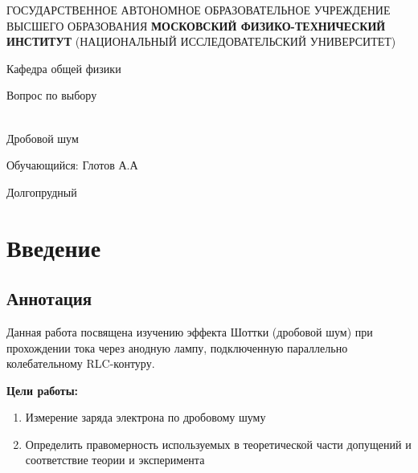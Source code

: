 \documentclass[12pt,a4paper]{article}
\author{Глотов Алексей}
\begin{document}
\newpage
\begin{center}
\footnotesize{{ГОСУДАРСТВЕННОЕ АВТОНОМНОЕ ОБРАЗОВАТЕЛЬНОЕ УЧРЕЖДЕНИЕ}\break
{ВЫСШЕГО ОБРАЗОВАНИЯ}
\break
{\bf {МОСКОВСКИЙ ФИЗИКО-ТЕХНИЧЕСКИЙ ИНСТИТУТ}}
\break
\small{(НАЦИОНАЛЬНЫЙ ИССЛЕДОВАТЕЛЬСКИЙ УНИВЕРСИТЕТ)}}
\break
\hfill \break
\hfill \break
\begin{center}
\large{Кафедра общей физики}
\end{center}
\hfill \break
\hfill \break
\hfill \break
\hfill \break

\begin{center}
\large{Вопрос по выбору}
\end{center}
\hfill \break\\
\LARGE{Дробовой шум}
\end{center}
\hfill \break
\hfill \break
\hfill \break
\hfill \break
\hfill \break
\hfill \break
\hfill \break
\hfill \break
\hfill \break
\hfill \break
\begin{flushright}
\large Обучающийся: Глотов А.А
\end{flushright}
\hfill \break
\hfill \break
\hfill \break
\hfill \break
\hfill \break
\hfill \break
\hfill \break
\hfill \break
\hfill \break
\hfill \break
\hfill \break
\hfill \break
\hfill \break
\begin{center}
Долгопрудный 
\end{center}
\thispagestyle{empty}
\newpage

\section{Введение}
\subsection{Аннотация}

\par Данная работа посвящена изучению эффекта Шоттки (дробовой шум) при прохождении тока через анодную лампу, подключенную параллельно колебательному RLC-контуру.
\break

\textbf{Цели работы: }\begin{enumerate}
\item Измерение заряда электрона по дробовому шуму 

\item Определить правомерность используемых в теоретической части допущений и соответствие теории и эксперимента
\end{enumerate}
\end{document}
